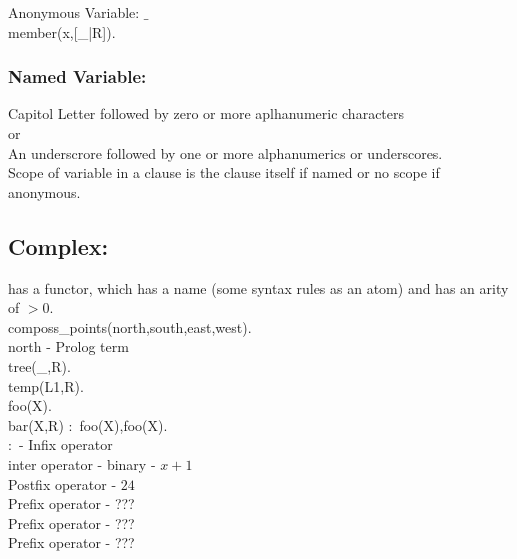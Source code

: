 \documentclass[a4paper,12pt]{article}
\begin{document}
Anonymous Variable: $\_$ \\

member(x,[_|R]). \\

\subsubsection{Named Variable:}

Capitol Letter followed by zero or more aplhanumeric characters \\

or \\

An underscrore followed by one or more alphanumerics or underscores. \\


Scope of variable in a clause is the clause itself if named or no scope if anonymous.

\subsection{Complex:}

has a functor, which has a name (some syntax rules as an atom) and has an arity of $\gt 0$. \\

composs_points(north,south,east,west). \\

north - Prolog term \\

tree(_,R). \\

temp(L1,R). \\

foo(X). \\

bar(X,R) $ : $ foo(X),foo(X). \\

$ : $ - Infix operator \\

inter operator - binary - $x + 1$ \\

Postfix operator - $24$ \\

Prefix operator - ??? \\

Prefix operator - ??? \\

Prefix operator - ??? \\
\end{document}
